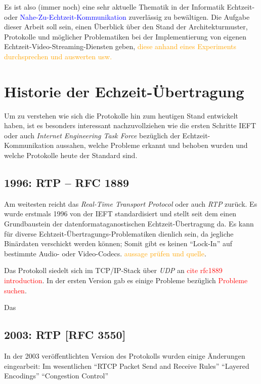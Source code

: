 \documentclass[journal]{IEEEtran}
\begin{document}
Es ist also (immer noch) eine sehr aktuelle Thematik in der Informatik
Echtzeit- oder \textcolor{blue}{Nahe-Zu-Echtzeit-Kommunikation} zuverlässig zu
bewältigen. Die Aufgabe dieser Arbeit soll sein, einen Überblick über den
Stand der Architekturmuster, Protokolle und möglicher Problematiken bei der
Implementierung von eigenen Echtzeit-Video-Streaming-Diensten geben,
\textcolor{orange}{diese anhand eines Experiments durchsprechen und auswerten
usw.}

\section{Historie der Echzeit-Übertragung}

Um zu verstehen wie sich die Protokolle hin zum heutigen Stand entwickelt
haben, ist es besonders interessant nachzuvollziehen wie die ersten Schritte
IEFT oder auch \textit{Internet Engineering Task Force} bezüglich der
Echtzeit-Kommunikation aussahen, welche Probleme erkannt und behoben wurden und
welche Protokolle heute der Standard sind.

\subsection{1996: RTP – RFC 1889}

Am weitesten reicht das \textit{Real-Time Transport Protocol} oder auch
\textit{RTP} zurück. Es wurde erstmals 1996 von der IEFT standardisiert und
stellt seit dem einen Grundbaustein der datenformataganostischen
Echtzeit-Übertragung da. Es kann für diverse
Echtzeit-Übertragungs-Problematiken dienlich sein, da jegliche Binärdaten
verschickt werden können; Somit gibt es keinen ``Lock-In'' auf bestimmte Audio-
oder Video-Codecs. \textcolor{orange}{aussage prüfen und quelle}.

Das Protokoll siedelt sich im TCP/IP-Stack über \textit{UDP} an
\textcolor{red}{cite rfc1889 introduction}.
In der ersten Version gab es einige Probleme bezüglich \textcolor{red}{Probleme
suchen}.

Das 
\subsection{2003: RTP [RFC 3550]}

In der 2003 veröffentlichten Version des Protokolls wurden einige Änderungen eingearbeit:
Im wesentlichen ``RTCP Packet Send and Receive Rules'' ``Layered Encodings'' ``Congestion Control''
\end{document}

